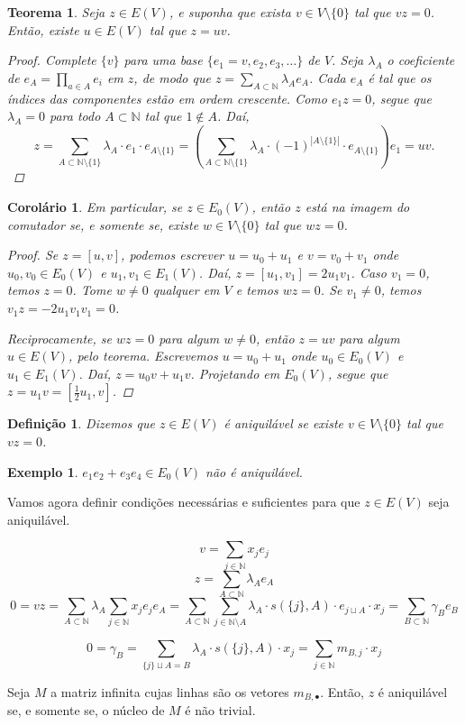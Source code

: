 \documentclass{article}
\newcommand{\N}{\mathbb{N}}
\newtheorem*{theorem}{Teorema}
\newtheorem*{corollary}{Corolário}
\newtheorem*{definition}{Definição}
\newtheorem*{example}{Exemplo}
\begin{document}
\begin{theorem}
    Seja $z \in E(V)$, e suponha que exista $v \in V \setminus \{0\}$ tal que $vz = 0$. Então, existe $u \in E(V)$ tal que $z = uv$.
    \begin{proof}
        Complete $\{v\}$ para uma base $\{e_1 = v, e_2, e_3, \dots\}$ de $V$. Seja $\lambda_A$ o coeficiente de $e_A = \prod_{a \in A} e_i$ em $z$, de modo que $z = \sum_{A \subset \N} \lambda_{A} e_{A}$. Cada $e_A$ é tal que os índices das componentes estão em ordem crescente. Como $e_1 z = 0$, segue que $\lambda_A = 0$ para todo $A \subset \N$ tal que $1 \not\in A$. Daí,
        \[
            z = \sum_{A \subset \N \setminus \{1\}} \lambda_A \cdot e_1 \cdot e_{A \setminus \{1\}} = \left(\sum_{A \subset \N \setminus \{1\}} \lambda_A \cdot {(-1)}^{|A \setminus \{1\}|}  \cdot e_{A \setminus \{1\}}\right) e_1 = uv.
        \]
    \end{proof}
\end{theorem}
\begin{corollary}
    Em particular, se $z \in E_0(V)$, então $z$ está na imagem do comutador se, e somente se, existe $w \in V \setminus \{0\}$ tal que $wz = 0$.
    \begin{proof}
        Se $z = [u, v]$, podemos escrever $u = u_0 + u_1$ e $v = v_0 + v_1$ onde $u_0, v_0 \in E_0(V)$ e $u_1, v_1 \in E_1(V)$. Daí, $z = [u_1, v_1] = 2u_1 v_1$. Caso $v_1 = 0$, temos $z = 0$. Tome $w \neq 0$ qualquer em $V$ e temos $wz = 0$. Se $v_1 \neq 0$, temos $v_1 z = -2 u_1 v_1 v_1 = 0$.

        Reciprocamente, se $wz = 0$ para algum $w \neq 0$, então $z = uv$ para algum $u \in E(V)$, pelo teorema. Escrevemos $u = u_0 + u_1$ onde $u_0 \in E_0(V)$ e $u_1 \in E_1(V)$. Daí, $z = u_0 v + u_1 v$. Projetando em $E_0(V)$, segue que $z = u_1 v =  \left [ \frac12u_1, v \right ]$.
    \end{proof}
\end{corollary}
\begin{definition}
    Dizemos que $z \in E(V)$ é \emph{aniquilável} se existe $v \in V \setminus \{0\}$ tal que $vz = 0$.
\end{definition}

\begin{example}
    $e_1e_2 + e_3e_4 \in E_0(V)$ não é aniquilável.
\end{example}

Vamos agora definir condições necessárias e suficientes para que $z \in E(V)$ seja aniquilável.

\[
    v = \sum_{j \in \N} x_j e_j
\]
\[
    z = \sum_{A \subset \N} \lambda_A e_A
\]
\[
    0 = vz = \sum_{A \subset \N} \lambda_A \sum_{j \in \N} x_j e_j e_A = \sum_{A \subset \N} \sum_{j \in \N \setminus A} \lambda_A \cdot s(\{j\}, A) \cdot  e_{j \sqcup A} \cdot x_j = \sum_{B \subset \N} \gamma_B e_B
\]

\[
    0 = \gamma_B = \sum_{\{j\} \sqcup A = B} \lambda_A \cdot s(\{j\}, A) \cdot x_j = \sum_{j \in \N} m_{B, j} \cdot x_j
\]

Seja $M$ a matriz infinita cujas linhas são os vetores $m_{B, \bullet}$.
Então, $z$ é aniquilável se, e somente se, o núcleo de $M$ é não trivial.
\end{document}
